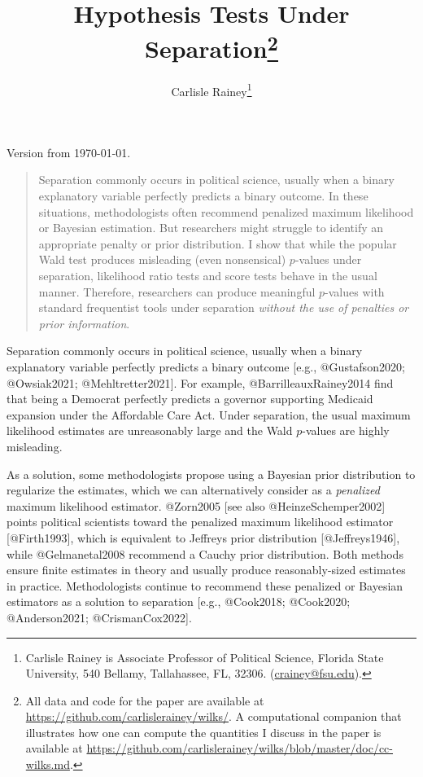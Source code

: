 \documentclass[
]{article}
\title{Hypothesis Tests Under Separation\footnote{All data and code for
  the paper are available at
  \url{https://github.com/carlislerainey/wilks/}. A computational
  companion that illustrates how one can compute the quantities I
  discuss in the paper is available at
  \url{https://github.com/carlislerainey/wilks/blob/master/doc/cc-wilks.md}.}}
\author{Carlisle Rainey\footnote{Carlisle Rainey is Associate Professor
  of Political Science, Florida State University, 540 Bellamy,
  Tallahassee, FL, 32306.
  (\href{mailto:crainey@fsu.edu}{crainey@fsu.edu}).}}
\date{}
\begin{document}
\maketitle

\begin{center}
Version from \today.
\end{center}

\vspace{1cm}

\begin{quote}
Separation commonly occurs in political science, usually when a binary explanatory variable perfectly predicts a binary outcome. In these situations, methodologists often recommend penalized maximum likelihood or Bayesian estimation. But researchers might struggle to identify an appropriate penalty or prior distribution. I show that while the popular Wald test produces misleading (even nonsensical) $p$-values under separation, likelihood ratio tests and score tests behave in the usual manner. Therefore, researchers can produce meaningful $p$-values with standard frequentist tools under separation \textit{without the use of penalties or prior information}.
\end{quote}

\newpage

\doublespacing

Separation commonly occurs in political science, usually when a binary
explanatory variable perfectly predicts a binary outcome {[}e.g.,
@Gustafson2020; @Owsiak2021; @Mehltretter2021{]}. For example,
@BarrilleauxRainey2014 find that being a Democrat perfectly predicts a
governor supporting Medicaid expansion under the Affordable Care Act.
Under separation, the usual maximum likelihood estimates are
unreasonably large and the Wald \(p\)-values are highly misleading.

As a solution, some methodologists propose using a Bayesian prior
distribution to regularize the estimates, which we can alternatively
consider as a \emph{penalized} maximum likelihood estimator. @Zorn2005
{[}see also @HeinzeSchemper2002{]} points political scientists toward
the penalized maximum likelihood estimator {[}@Firth1993{]}, which is
equivalent to Jeffreys prior distribution {[}@Jeffreys1946{]}, while
@Gelmanetal2008 recommend a Cauchy prior distribution. Both methods
ensure finite estimates in theory and usually produce reasonably-sized
estimates in practice. Methodologists continue to recommend these
penalized or Bayesian estimators as a solution to separation {[}e.g.,
@Cook2018; @Cook2020; @Anderson2021; @CrismanCox2022{]}.
\end{document}
